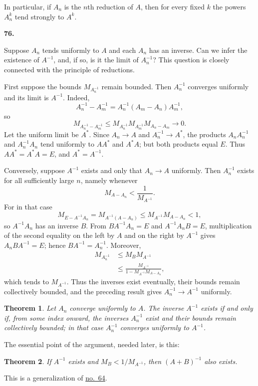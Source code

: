 \documentclass[
  paper=b5,
  fontsize=13pt,
  twoside=true,
  open=any,
  bookmarkpackage=false,
  chapterprefix=true,
  headings=normal
]{scrbook}
\newtheorem*{theorem}{Theorem}
\theoremstyle{definition}
\newcommand{\numberedparagraph}[1]{%
  \par\medskip\phantomsection\label{sec:#1}%
  \noindent\textbf{#1.}\enspace
}
\begin{document}
In particular, if $A_n$ is the $n$th reduction of $A$, then for every
fixed $k$ the powers $A_n^k$ tend strongly to $A^k$.

\numberedparagraph{76}
Suppose $A_n$ tends uniformly to $A$ and each $A_n$ has an inverse. Can we
infer the existence of $A^{-1}$, and, if so, is it the limit of
$A_n^{-1}$? This question is closely connected with the principle of
reductions.

First suppose the bounds $M_{A_n^{-1}}$ remain bounded. Then
$A_n^{-1}$ converges uniformly and its limit is $A^{-1}$. Indeed,
\[
 A_n^{-1}-A_m^{-1}=A_n^{-1}(A_m-A_n)A_m^{-1},
\]
so
\[
 M_{A_n^{-1}-A_m^{-1}}
 \leq M_{A_n^{-1}}M_{A_m^{-1}}M_{A_n-A_m}\longrightarrow0.
\]
Let the uniform limit be $A^*$. Since $A_n\to A$ and
$A_n^{-1}\to A^*$, the products $A_nA_n^{-1}$ and $A_n^{-1}A_n$ tend
uniformly to $AA^*$ and $A^*A$; but both products equal $E$. Thus
$AA^*=A^*A=E$, and $A^*=A^{-1}$.

Conversely, suppose $A^{-1}$ exists and only that $A_n\to A$ uniformly.
Then $A_n^{-1}$ exists for all sufficiently large $n$, namely whenever
\[
  M_{A-A_n}<\frac1{M_{A^{-1}}}.
\]
For in that case
\[
 M_{E-A^{-1}A_n}
 =M_{A^{-1}(A-A_n)}
 \leq M_{A^{-1}}M_{A-A_n}<1,
\]
so $A^{-1}A_n$ has an inverse $B$. From
$B A^{-1}A_n=E$ and $A^{-1}A_nB=E$, multiplication of the second equality
on the left by $A$ and on the right by $A^{-1}$ gives
$A_nBA^{-1}=E$; hence $BA^{-1}=A_n^{-1}$. Moreover,
\[
\begin{split}
 M_{A_n^{-1}}
 &\leq M_BM_{A^{-1}}\\
 &\leq
 \frac{M_{A^{-1}}}
 {1-M_{A^{-1}}M_{A-A_n}},
\end{split}
\]
which tends to $M_{A^{-1}}$. Thus the inverses exist eventually, their
bounds remain collectively bounded, and the preceding result gives
$A_n^{-1}\to A^{-1}$ uniformly.

\begin{theorem}
Let $A_n$ converge uniformly to $A$. The inverse $A^{-1}$ exists if and
only if, from some index onward, the inverses $A_n^{-1}$ exist and their
bounds remain collectively bounded; in that case $A_n^{-1}$ converges
uniformly to $A^{-1}$.
\end{theorem}

The essential point of the argument, needed later, is this:
\begin{theorem}
If $A^{-1}$ exists and $M_B<1/M_{A^{-1}}$, then $(A+B)^{-1}$ also exists.
\end{theorem}
This is a generalization of \hyperref[sec:64]{no.~64}.
\end{document}
